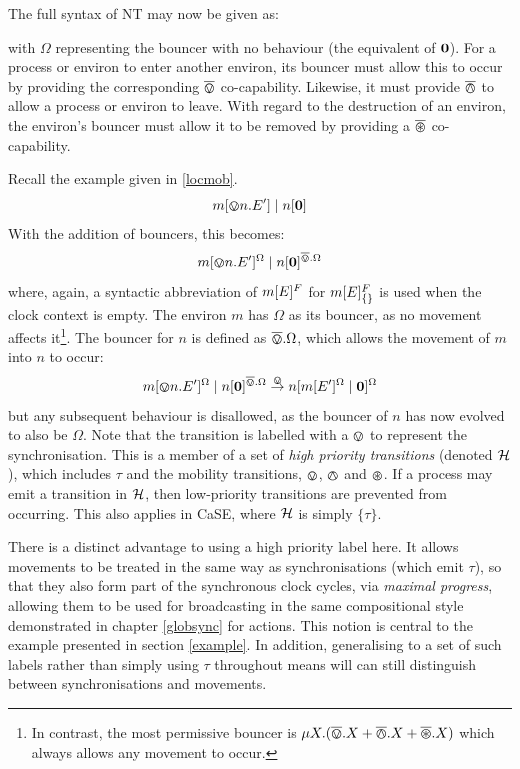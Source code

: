 The full syntax of NT may now be given as:

\begin{equation}
  
   \label{eqn:nt:syntax}
\end{equation}
with $\Omega$ representing the bouncer with no behaviour (the
equivalent of $\textbf{0}$).  For a process or environ to enter another
environ, its bouncer must allow this to occur by providing the
corresponding $\overline{\varovee}$ co-capability.  Likewise, it must provide $\overline{\varowedge}$
to allow a process or environ to leave.  With regard to the destruction
of an environ, the environ's bouncer must allow it to be removed by
providing a $\overline{\varoast}$ co-capability.

Recall the example given in \ref{locmob}.
\begin{equation}
{m}[ \varovee n.E^\prime ]\;|\;{n}[ \textbf{0} ]
\end{equation}
With the addition of bouncers, this becomes:
\begin{equation}
{m}[ \varovee n.E^\prime ]^{\Omega}\;|\;{n}[ \textbf{0} ]^{\overline{\varovee}.\Omega}
\end{equation}
where, again, a syntactic abbreviation of ${m}[ E ]^{F}$ for
${m}[ E ]^{F}_{\{\}}$ is used when the clock context is empty. The environ
$m$ has $\Omega$ as its bouncer, as no movement affects it\footnote{In
  contrast, the most permissive bouncer is $\mu X.(\overline{\varovee} .X + \overline{\varowedge} .X
  + \overline{\varoast} .X)$ which always allows any movement to occur.}.  The
bouncer for $n$ is defined as $\overline{\varovee}.\Omega$, which allows the movement
of $m$ into $n$ to occur:
\begin{equation}
{m}[ \varovee n.E^\prime ]^{\Omega}\;|\;{n}[ \textbf{0} ]^{\overline{\varovee}.\Omega}
 \stackrel{\varovee}{\rightarrow}
{n}[ {m}[ E^\prime ]^{\Omega} \;|\; \textbf{0} ]^{\Omega}
\end{equation}
but any subsequent behaviour is disallowed, as the bouncer of $n$ has
now evolved to also be $\Omega$.  Note that the transition is labelled
with a $\varovee$ to represent the synchronisation.  This is a member of a
set of \emph{high priority transitions} (denoted $\text{$\mathcal{H}$}$), which
includes $\tau$ and the mobility transitions, $\varovee$, $\varowedge$ and
$\varoast$.  If a process may emit a transition in $\text{$\mathcal{H}$}$, then
low-priority transitions are prevented from occurring.  This also
applies in CaSE, where $\text{$\mathcal{H}$}$ is simply $\{ \tau \}$.  

There is a distinct advantage to using a high priority label here.  It
allows movements to be treated in the same way as synchronisations
(which emit $\tau$), so that they also form part of the synchronous
clock cycles, via \emph{maximal progress}, allowing them to be used for
broadcasting in the same compositional style demonstrated in chapter
\ref{globsync} for actions.  This notion is central to the example
presented in section \ref{example}.  In addition, generalising to a set
of such labels rather than simply using $\tau$ throughout means will can
still distinguish between synchronisations and movements.

